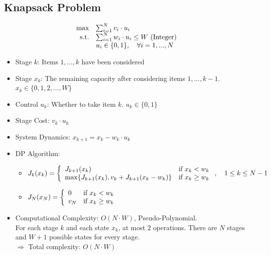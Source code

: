 \subsection{Knapsack Problem}
\[
    \begin{array}{rl}
        \max & \sum_{i=1}^N v_i\cdot u_i \\
        \text{s.t.}  & \sum_{i=1}^N w_i\cdot u_i \leq W \text{ \rm (Integer)} \\
        & u_i \in \{0,1\},\quad \forall i=1,...,N        
    \end{array}
\]
\begin{itemize}
    \item Stage $k$: Items $1,...,k$ have been considered
    \item Stage $x_k$: The remaining capacity after considering items $1,...,k-1$. $x_k\in\{0,1,2,...,W\}$
    \item Control $u_k$: Whether to take item $k$. $u_k\in \{0,1\}$
    \item Stage Cost: $v_k\cdot u_k$
    \item System Dynamics: $x_{k+1}=x_k-w_k\cdot u_k$
    \item DP Algorithm:
    \begin{itemize}
        \item $
            J_k(x_k) = \left\{ \begin{array}{ll}
                J_{k+1}(x_k) & \text{\rm if } x_k < w_k \\
                \max \{ J_{k+1}(x_k), v_k+J_{k+1}(x_k-w_k) \} & \text{\rm if } x_k \geq w_k
            \end{array} \right. ,\quad 1\leq k\leq N-1$
        \item $
            J_N(x_N) = \left\{ \begin{array}{ll}
                0 & \text{\rm if } x_k < w_k \\
                v_N & \text{\rm if } x_k \geq w_k
            \end{array} \right.$
    \end{itemize}
    \item Computational Complexity: $O(N\cdot W)$, Pseudo-Polynomial. \\
    For each stage $k$ and each state $x_k$, at most $2$ operations. There are $N$ stages and $W+1$ possible states for every stage. \\
    $\Longrightarrow$ Total complexity: $O(N\cdot W)$
\end{itemize}

